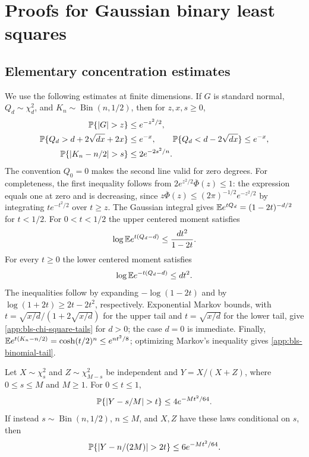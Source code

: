 \section{Proofs for Gaussian binary least squares}
\label{app:bls-proofs}

\subsection{Elementary concentration estimates}
\label{app:bls-probability-lemmas}

We use the following estimates at finite dimensions.  If $G$ is standard
normal, $Q_d\sim\chi^2_d$, and $K_n\sim\operatorname{Bin}(n,1/2)$, then
for $z,x,s\ge0$,
\begin{align}
 \Pbb\{|G|>z\}&\le e^{-z^2/2},
 \label{app:bls-normal-tail}\\
 \Pbb\{Q_d>d+2\sqrt{dx}+2x\}&\le e^{-x},\qquad
 \Pbb\{Q_d<d-2\sqrt{dx}\}\le e^{-x},
 \label{app:bls-chi-square-tails}\\
 \Pbb\{|K_n-n/2|>s\}&\le2e^{-2s^2/n}.
 \label{app:bls-binomial-tail}
\end{align}
The convention $Q_0=0$ makes the second line valid for zero degrees.
For completeness, the first inequality follows from
$2e^{z^2/2}\overline\Phi(z)\le1$: the expression equals one at zero
and is decreasing, since
$z\overline\Phi(z)\le(2\pi)^{-1/2}e^{-z^2/2}$ by integrating
$t e^{-t^2/2}$ over $t\ge z$.
The Gaussian integral gives
$\mathbb{E} e^{tQ_d}=(1-2t)^{-d/2}$ for $t<1/2$.
For $0<t<1/2$ the upper centered moment satisfies
\[
 \log\mathbb{E} e^{t(Q_d-d)}\le\frac{dt^2}{1-2t}.
\]
For every $t\ge0$ the lower centered moment satisfies
\[
 \log\mathbb{E} e^{-t(Q_d-d)}\le dt^2.
\]
The inequalities follow by expanding $-\log(1-2t)$ and by
$\log(1+2t)\ge2t-2t^2$, respectively.  Exponential Markov bounds,
with $t=\sqrt{x/d}/(1+2\sqrt{x/d})$ for the upper tail and
$t=\sqrt{x/d}$ for the lower tail, give
\eqref{app:bls-chi-square-tails} for $d>0$; the case $d=0$ is immediate.
Finally,
$\mathbb{E} e^{t(K_n-n/2)}=\cosh(t/2)^n\le e^{nt^2/8}$; optimizing Markov's
inequality gives \eqref{app:bls-binomial-tail}.

\begin{lemma}
\label{app:bls-beta-concentration}
Let $X\sim\chi^2_s$ and $Z\sim\chi^2_{M-s}$ be independent and
$Y=X/(X+Z)$, where $0\le s\le M$ and $M\ge1$.
For $0\le t\le1$,
\[
 \Pbb\{|Y-s/M|>t\}\le4e^{-Mt^2/64}.
\]
If instead $s\sim\operatorname{Bin}(n,1/2)$, $n\le M$, and $X,Z$
have these laws conditional on $s$, then
\[
 \Pbb\{|Y-n/(2M)|>2t\}\le6e^{-Mt^2/64}.
\]
\end{lemma}

